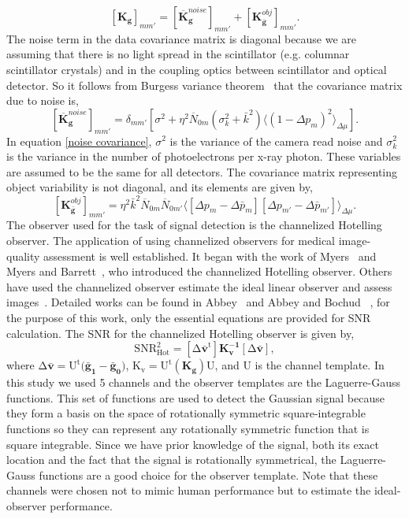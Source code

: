 %
\begin{equation}
\label{gen covariance2}
[\mathbf{K_g}]_{mm'} = [\overline{\mathbf{K}}_\mathbf{g}^{noise}]_{mm'}+[\mathbf{K}_{\mathbf{\bar{g}}}^{obj}]_{mm'}.
\end{equation}
%
The noise term in the data covariance matrix is diagonal because we are assuming that there is no light spread in the scintillator (e.g. columnar scintillator crystals) and in the coupling optics between scintillator and optical detector.  So it follows from Burgess variance theorem~\citep{Barrett2004} that the covariance matrix due to noise is,
%
\begin{equation}
\label{noise covariance}
[\overline{\mathbf{K}}_\mathbf{g}^{noise}]_{mm'}= \delta_{mm'}[\sigma^2 + \eta^2 \overline{N}_{0m} (\sigma_k^2 + \bar{k}^2)\langle(1-\Delta p_m)^2 \rangle_{\Delta\mu}].
\end{equation}
%
In equation \ref{noise covariance}, $\sigma^2$ is the variance of the camera read noise and $\sigma_k^2$ is the variance in the number of photoelectrons per x-ray photon.  These variables are assumed to be the same for all detectors.
The covariance matrix representing object variability is not diagonal, and its elements are given by,
%
\begin{equation}
\label{object covariance}
[\mathbf{K}_{\mathbf{\bar{g}}}^{obj}]_{mm'}=\eta^2\bar{k}^2\overline{N}_{0m}\overline{N}_{0m'} \langle[\Delta p_m - \Delta \bar{p}_m][\Delta p_{m'}-\Delta \bar{p}_{m'}]\rangle _{\Delta \mu}.
\end{equation}
%
The observer used for the task of signal detection is the channelized Hotelling observer.  The application of using channelized observers for medical image-quality assessment is well established.  It began with the work of Myers~\citep{MyersThesis} and Myers and Barrett~\citep{Myers1987}, who introduced the channelized Hotelling observer.  Others have used the channelized observer estimate the ideal linear observer and assess images~\citep{Gallas2003,Abbey2000, Abbey2001}.  Detailed works can be found in Abbey~\citep{AbbeyThesis} and Abbey and Bochud~\citep{Abbey2000} , for the purpose of this work, only the essential equations are provided for SNR calculation.
The SNR for the channelized Hotelling observer is given by,
%
\begin{equation}
\label{SNR hot}
\mathrm{SNR^2_{Hot} = [\Delta \mathbf{\bar{v}}^t]\mathbf{K_v^{-1}}[\Delta \mathbf{\bar{v}}]},
\end{equation}
%
where $\mathrm{\Delta \mathbf{\bar{v}} = U^t(\mathbf{\bar{g}_1}-\mathbf{\bar{g}_0)}}$, $\mathrm{K_v= U^t(\mathbf{K_g})U}$, and $\mathrm{U}$ is the channel template.  In this study we used 5 channels and the observer templates are the Laguerre-Gauss functions.  This set of functions are used to detect the Gaussian signal because they form a basis on the space of rotationally symmetric square-integrable functions so they can represent any rotationally symmetric function that is square integrable.  Since we have prior knowledge of the signal, both its exact location and the fact that the signal is rotationally symmetrical, the Laguerre-Gauss functions are a good choice for the observer template.  Note that these channels were chosen not to mimic human performance but to estimate the ideal-observer performance.

